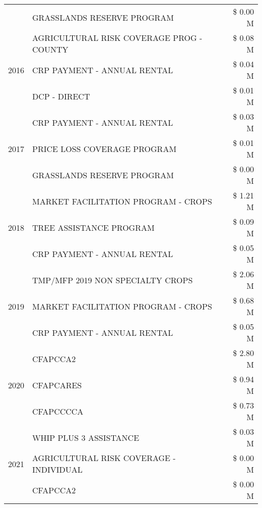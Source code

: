 \begin{tabular}{llr}
 & GRASSLANDS RESERVE PROGRAM & \$ 0.00 M \\
\cline{1-3}
\multirow[t]{3}{*}{2016} & AGRICULTURAL RISK COVERAGE PROG - COUNTY & \$ 0.08 M \\
 & CRP PAYMENT - ANNUAL RENTAL & \$ 0.04 M \\
 & DCP - DIRECT & \$ 0.01 M \\
\cline{1-3}
\multirow[t]{3}{*}{2017} & CRP PAYMENT - ANNUAL RENTAL & \$ 0.03 M \\
 & PRICE LOSS COVERAGE PROGRAM & \$ 0.01 M \\
 & GRASSLANDS RESERVE PROGRAM & \$ 0.00 M \\
\cline{1-3}
\multirow[t]{3}{*}{2018} & MARKET FACILITATION PROGRAM - CROPS & \$ 1.21 M \\
 & TREE ASSISTANCE PROGRAM & \$ 0.09 M \\
 & CRP PAYMENT - ANNUAL RENTAL & \$ 0.05 M \\
\cline{1-3}
\multirow[t]{3}{*}{2019} & TMP/MFP 2019 NON SPECIALTY CROPS & \$ 2.06 M \\
 & MARKET FACILITATION PROGRAM - CROPS & \$ 0.68 M \\
 & CRP PAYMENT - ANNUAL RENTAL & \$ 0.05 M \\
\cline{1-3}
\multirow[t]{3}{*}{2020} & CFAPCCA2 & \$ 2.80 M \\
 & CFAPCARES & \$ 0.94 M \\
 & CFAPCCCCA & \$ 0.73 M \\
\cline{1-3}
\multirow[t]{3}{*}{2021} & WHIP PLUS 3 ASSISTANCE & \$ 0.03 M \\
 & AGRICULTURAL RISK COVERAGE - INDIVIDUAL & \$ 0.00 M \\
 & CFAPCCA2 & \$ 0.00 M \\
\cline{1-3}
\bottomrule
\end{tabular}
